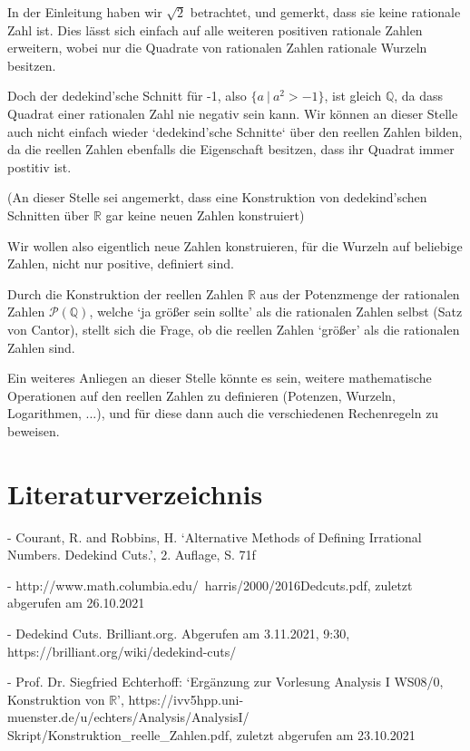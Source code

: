 \documentclass[12pt]{article}
\begin{document}
    In der Einleitung haben wir $\sqrt{2}$ betrachtet, und gemerkt, dass sie keine rationale Zahl ist.
    Dies lässt sich einfach auf alle weiteren positiven rationale Zahlen erweitern, wobei nur die Quadrate von rationalen Zahlen
    rationale Wurzeln besitzen.

    Doch der dedekind'sche Schnitt für -1, also $\{a \mspace{4mu} | \mspace{4mu} a^2 > -1\}$, ist gleich $\mathbb{Q}$,
    da dass Quadrat einer rationalen Zahl nie negativ sein kann.
    Wir können an dieser Stelle auch nicht einfach wieder `dedekind'sche Schnitte` über den reellen Zahlen bilden,
    da die reellen Zahlen ebenfalls die Eigenschaft besitzen, dass ihr Quadrat immer postitiv ist.

    (An dieser Stelle sei angemerkt, dass eine Konstruktion von dedekind'schen Schnitten über $\mathbb{R}$ gar
    keine neuen Zahlen konstruiert)

    Wir wollen also eigentlich neue Zahlen konstruieren, für die Wurzeln auf beliebige Zahlen, nicht nur positive,
    definiert sind.

    Durch die Konstruktion der reellen Zahlen $\mathbb{R}$ aus der Potenzmenge der rationalen Zahlen
    $\mathcal{P}(\mathbb{Q})$, welche `ja größer sein sollte' als die rationalen Zahlen selbst
    (Satz von Cantor), stellt sich die Frage, ob die reellen Zahlen `größer' als die rationalen Zahlen sind.

    Ein weiteres Anliegen an dieser Stelle könnte es sein, weitere mathematische Operationen auf den
    reellen Zahlen zu definieren (Potenzen, Wurzeln, Logarithmen, ...), und für diese dann auch die
    verschiedenen Rechenregeln zu beweisen.

    \newpage

    \section{Literaturverzeichnis}

    - Courant, R. and Robbins, H. `Alternative Methods of Defining Irrational Numbers. Dedekind Cuts.', 2. Auflage,
    S. 71f

    - http://www.math.columbia.edu/~harris/2000/2016Dedcuts.pdf, zuletzt abgerufen am 26.10.2021

    - Dedekind Cuts. Brilliant.org. Abgerufen am 3.11.2021, 9:30, https://brilliant.org/wiki/dedekind-cuts/

    - Prof. Dr. Siegfried Echterhoff: `Ergänzung zur Vorlesung Analysis I WS08/0, Konstruktion von $\mathbb{R}$',
    https://ivv5hpp.uni-muenster.de/u/echters/Analysis/AnalysisI/ $\mspace{8mu}$ Skript/Konstruktion\_reelle\_Zahlen.pdf,
    zuletzt abgerufen am 23.10.2021
\end{document}
